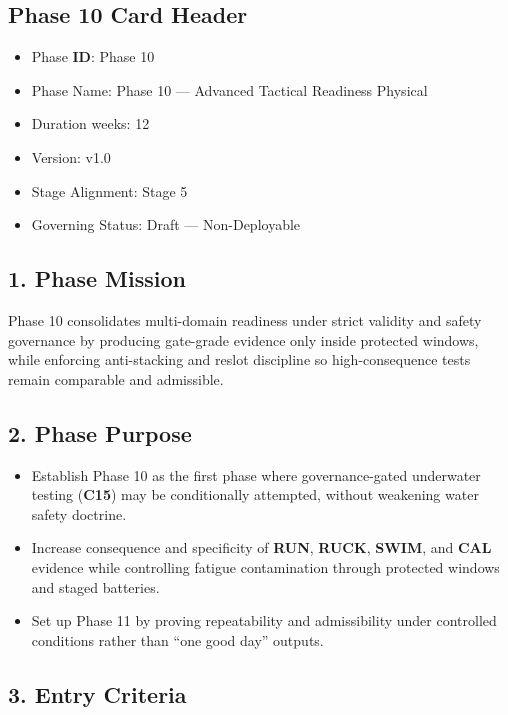 \documentclass[10pt]{article}
\begin{document}
\subsection*{Phase 10 Card Header}
{}

\begin{itemize}
\item Phase \textbf{ID}: Phase 10
\item Phase Name: Phase 10 — Advanced Tactical Readiness Physical
\item Duration weeks: 12
\item Version: v1.0
\item Stage Alignment: Stage 5
\item Governing Status: Draft — Non-Deployable
\end{itemize}

\subsection*{1. Phase Mission}

Phase 10 consolidates multi-domain readiness under strict validity and safety governance by producing gate-grade evidence only inside protected windows, while enforcing anti-stacking and reslot discipline so high-consequence tests remain comparable and admissible.

\subsection*{2. Phase Purpose}

\begin{itemize}
\item Establish Phase 10 as the first phase where governance-gated underwater testing (\textbf{C15}) may be conditionally attempted, without weakening water safety doctrine.
\item Increase consequence and specificity of \textbf{RUN}, \textbf{RUCK}, \textbf{SWIM}, and \textbf{CAL} evidence while controlling fatigue contamination through protected windows and staged batteries.
\item Set up Phase 11 by proving repeatability and admissibility under controlled conditions rather than “one good day” outputs.
\end{itemize}

\subsection*{3. Entry Criteria}
\end{document}
